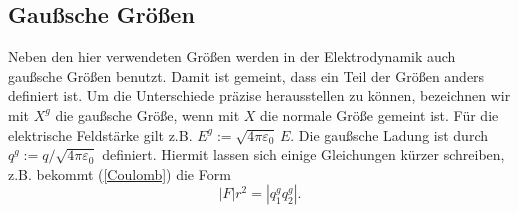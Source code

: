 \documentclass[a4paper,10pt,fleqn,twocolumn,twoside]{article}
\begin{document}
\subsection{Gaußsche Größen}
Neben den hier verwendeten Größen werden in der Elektrodynamik
auch gaußsche Größen benutzt. Damit ist gemeint, dass ein Teil
der Größen anders definiert ist. Um die Unterschiede präzise
herausstellen zu können, bezeichnen wir mit $X^g$ die gaußsche Größe,
wenn mit $X$ die normale Größe gemeint ist.
Für die elektrische Feldstärke gilt z.B.
$E^g := \sqrt{4\pi\varepsilon_0}\,E$.
Die gaußsche Ladung ist durch
$q^g:=q/\sqrt{4\pi\varepsilon_0}$ definiert. Hiermit lassen
sich einige Gleichungen kürzer schreiben, z.B. bekommt
(\ref{Coulomb}) die Form
\begin{equation}
|F|r^2 = |q_1^g q_2^g|.
\end{equation}
\end{document}
